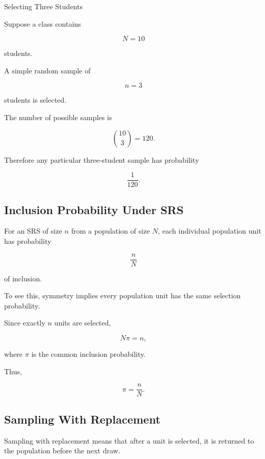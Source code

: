 \begin{workedexamplebox}{Selecting Three Students}

Suppose a class contains

\[
N=10
\]

students.

A simple random sample of

\[
n=3
\]

students is selected.

The number of possible samples is

\[
\binom{10}{3}
=
120.
\]

Therefore any particular three-student sample has probability

\begin{answerbox}
\[
\boxed{
\frac1{120}.
}
\]
\end{answerbox}

\end{workedexamplebox}

\subsection{Inclusion Probability Under SRS}
\label{subsec:srs-inclusion-probability}

For an SRS of size \(n\) from a population of size \(N\), each individual
population unit has probability

\[
\boxed{
\frac nN
}
\]

of inclusion.

To see this, symmetry implies every population unit has the same
selection probability.

Since exactly \(n\) units are selected,

\[
N\pi=n,
\]

where \(\pi\) is the common inclusion probability.

Thus,

\[
\boxed{
\pi=\frac nN.
}
\]

\subsection{Sampling With Replacement}
\label{subsec:sampling-with-replacement}

Sampling with replacement means that after a unit is selected, it is
returned to the population before the next draw.

